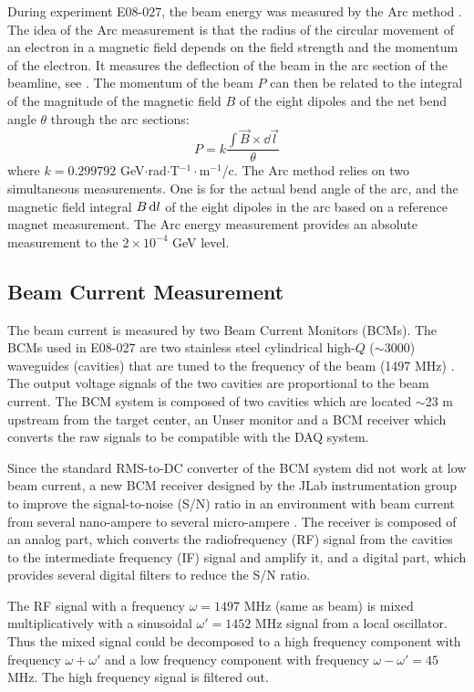 During experiment E08-027, the beam energy was measured by the Arc method \cite{Alcorn2004}. The idea of the Arc measurement is that the radius of the circular movement of an electron in a magnetic field depends on the field strength and the momentum of the electron. It measures the deflection of the beam in the arc section of the beamline, see . The momentum of the beam $P$ can then be related to the integral of the magnitude of the magnetic field $B$ of the eight dipoles and the net bend angle $\theta$ through the arc sections:
\begin{equation} \label{C5S2SS1E1}
P = k \frac{\int\vec{B}\times\dd{\vec{l}}}{\theta}
\end{equation}
where $k=0.299792$ GeV$\cdot$rad$\cdot$T${}^{−1}\cdot$m${}^{−1}$/c. The Arc method relies on two simultaneous measurements. One is for the actual bend angle of the arc, and the magnetic field integral $B\dd{l}$ of the eight dipoles in the arc based on a reference magnet measurement. The Arc energy measurement provides an absolute measurement to the $2\times10^{-4}$ GeV level.

\subsection{Beam Current Measurement}
\label{C5S2SS2}

The beam current is measured by two Beam Current Monitors (BCMs). The BCMs used in E08-027 are two stainless steel cylindrical high-$Q$ ($\sim$3000) waveguides (cavities) that are tuned to the frequency of the beam (1497 MHz) \cite{Alcorn2004}. The output voltage signals of the two cavities are proportional to the beam current. The BCM system is composed of two cavities which are located $\sim$23 m upstream from the target center, an Unser monitor and a BCM receiver which converts the raw signals to be compatible with the DAQ system.

Since the standard RMS-to-DC converter of the BCM system \cite{Denard2001} did not work at low beam current, a new BCM receiver designed by the JLab instrumentation group to improve the signal-to-noise (S/N) ratio in an environment with beam current from several nano-ampere to several micro-ampere \cite{Musson2012}. The receiver is composed of an analog part, which converts the radiofrequency (RF) signal from the cavities to the intermediate frequency (IF) signal and amplify it, and a digital part, which provides several digital filters to reduce the S/N ratio.

The RF signal with a frequency $\omega=1497$ MHz (same as beam) is mixed multiplicatively with a sinusoidal $\omega'=1452$ MHz signal from a local oscillator. Thus the mixed signal could be decomposed to a high frequency component with frequency $\omega+\omega'$ and a low frequency component with frequency $\omega-\omega'=45$ MHz. The high frequency signal is filtered out.

